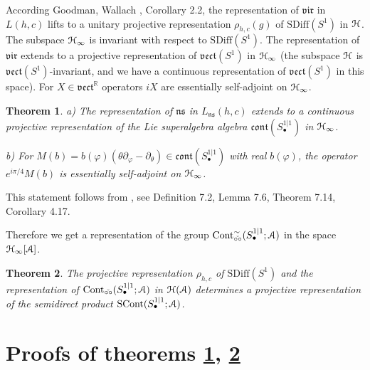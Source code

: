 \documentclass[]{amsart}
\newcounter{sec}
\newcounter{punct}[sec]
\newtheorem{theorem}{Theorem}[sec]
\def\COUNTERS{\addtocounter{sec}{1}
              \setcounter{punct}{0}
          \setcounter{equation}{0}
          \setcounter{theorem}{0}
          }
\def\phi{\varphi}
\def\cA{\EuScript A}
\def\cH{\EuScript H}
\def\R {{\mathbb R }}
\def\sm{\smallskip}
\def\SDiff{\mathrm{SDiff}}
\def\SCont{\mathrm{SCont}}
\def\vect{\mathfrak{vect}}
\def\ns{\mathfrak{ns}}
\def\vir{\mathfrak{vir}}
\def\cont{\mathfrak{cont}}
\def\Cont{{\mathrm{Cont}}}
\def\vel{{\check{\circ\circ}}}
\begin{document}
According Goodman, Wallach \cite{GW}, Corollary 2.2, the representation of 
$\vir$ in $L(h,c)$ lifts to a unitary projective representation
$\rho_{h,c}(g)$ of $\SDiff(S^1)$ in $\cH$. The subspace 
$\cH_\infty$ is invariant with respect to $\SDiff(S^1)$.
The representation of $\vir$ extends to a projective representation
of $\vect(S^1)$ in $\cH_\infty$ (the subspace $\cH$ is $\vect(S^1)$-invariant,
and we have a continuous representation of $\vect(S^1)$
in this space). For  $X\in \vect^\R$ operators $iX$  are essentially
self-adjoint on $\cH_\infty$.




\begin{theorem}
\label{th:2}
{\rm a)} The representation of $\ns$ in $L_\ns(h,c)$ extends to a continuous projective representation of the Lie superalgebra
algebra $\cont(S^{1|1}_\bullet)$ in $\cH_\infty$.

\sm

{\rm b)} For $M(b)= b(\phi) (\theta\partial_\phi-\partial_\theta)
\in \cont(S^{1|1}_\bullet)$   
with real $b(\phi)$, the operator $e^{i\pi/4}M(b)$ is essentially 
self-adjoint
on $\cH_\infty$.
\end{theorem}

This statement follows from  \cite{NeeS}, see Definition 7.2, Lemma 7.6,
Theorem 7.14, Corollary 4.17.

Therefore we get a representation of the group 
$\Cont_\vel^\sim(S^{1|1}_\bullet;\cA)$
 in the space  $\cH_\infty[\cA]$.

\begin{theorem}
	\label{th:3}
 The projective representation $\rho_{h,c}$ of $\SDiff(S^1)$ and the representation of $\Cont_\vel(S^{1|1}_\bullet;\cA)$ in $\cH(\cA)$
 determines a projective representation of the semidirect product 
 $\SCont(S^{1|1}_\bullet;\cA)$.
\end{theorem}



\section{Proofs of theorems \ref{th:2}, \ref{th:3}\label{s:proof}}

\COUNTERS
\end{document}
